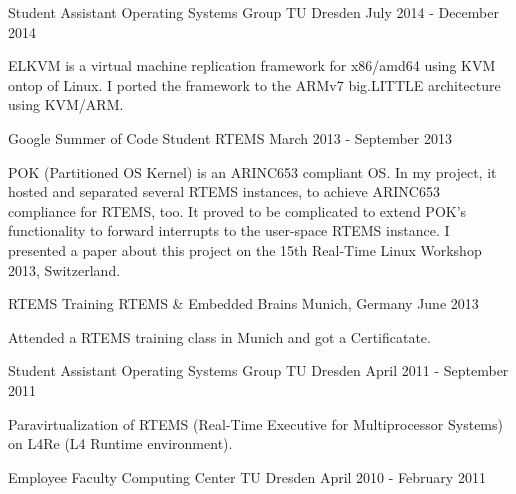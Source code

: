 \begin{cventries}
  \cventry
    {Student Assistant}
    {Operating Systems Group}
    {TU Dresden}
    {July 2014 - December 2014}
    {
      \begin{cvitems}
      \item {ELKVM is a virtual machine replication framework for x86/amd64 using KVM
      ontop of Linux. I ported the framework to the ARMv7 big.LITTLE
      architecture using KVM/ARM.}
      \end{cvitems}
    }
  \cventry
    {Google Summer of Code Student}
    {RTEMS}
    {}
    {March 2013 - September 2013}
    {
      \begin{cvitems}
      \item {POK (Partitioned OS Kernel) is an ARINC653 compliant OS. In my
	  project, it hosted and separated several RTEMS instances, to achieve
      ARINC653 compliance for RTEMS, too. It proved to be complicated to extend
      POK's functionality to forward interrupts to the user-space RTEMS
      instance. I presented a paper about this project on the 15th Real-Time Linux
    Workshop 2013, Switzerland.}
      \end{cvitems}
    }
  \cventry
    {RTEMS Training}
    {RTEMS \& Embedded Brains}
    {Munich, Germany}
    {June 2013}
    {
      \begin{cvitems}
      \item {Attended a RTEMS training class in Munich and got a
	Certificatate.}
      \end{cvitems}
    }
  \cventry
    {Student Assistant}
    {Operating Systems Group}
    {TU Dresden}
    {April 2011 - September 2011}
    {
      \begin{cvitems}
      \item {Paravirtualization of RTEMS (Real-Time Executive for
	Multiprocessor Systems) on L4Re (L4 Runtime environment).}
      \end{cvitems}
    }
  \cventry
    {Employee}
    {Faculty Computing Center}
    {TU Dresden}
    {April 2010 - February 2011}
    {}
\end{cventries}
